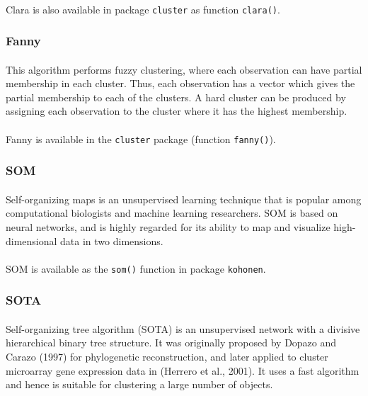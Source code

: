 \documentclass[10pt]{article}\usepackage[]{graphicx}\usepackage[]{color}
\begin{document}
\paragraph{}
Clara is
also available in package \texttt{cluster} as function \texttt{clara()}.


\subsubsection{Fanny}
\paragraph{}
This algorithm performs fuzzy clustering, where each observation can have
partial membership in each cluster. Thus,
each observation has a vector which gives the partial membership to each of
the clusters. A hard cluster can be produced by assigning each observation
to the cluster where it has the highest membership. 
\paragraph{}
Fanny is available in the \texttt{cluster} package (function \texttt{fanny()}).


\subsubsection{SOM}
\paragraph{}
Self-organizing maps is an unsupervised learning technique
that is popular among computational biologists and machine learning researchers.
SOM is based on neural networks, and is highly regarded for its
ability to map and visualize high-dimensional data in two dimensions.
\paragraph{}
SOM is available as the \texttt{som()} function in package \texttt{kohonen}.


\subsubsection{SOTA}
\paragraph{}
Self-organizing tree algorithm (SOTA) is an unsupervised network with a
divisive hierarchical binary tree structure. It was originally proposed by
Dopazo and Carazo (1997) for phylogenetic reconstruction, and later applied
to cluster microarray gene expression data in (Herrero et al., 2001). It uses a
fast algorithm and hence is suitable for clustering a large number of objects.
\end{document}
